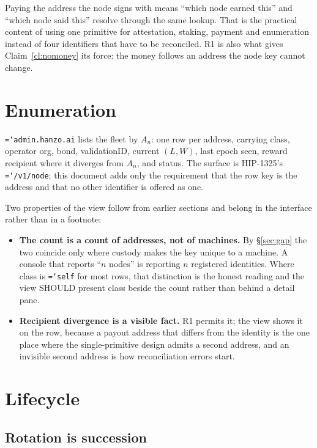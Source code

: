 \documentclass[11pt,a4paper]{article}
\newcommand{\code}[1]{\texttt{\hyphenchar\font=`\-\relax #1}}
\begin{document}
Paying the address the node signs with means ``which node earned this'' and ``which
node said this'' resolve through the same lookup. That is the practical content of
using one primitive for attestation, staking, payment and enumeration instead of
four identifiers that have to be reconciled. R1 is also what gives
Claim~\ref{cl:nomoney} its force: the money follows an address the node key cannot
change.

\section{Enumeration}
\label{sec:enum}

\code{admin.hanzo.ai} lists the fleet by $A_n$: one row per address, carrying
class, operator org, bond, validationID, current $(L, W)$, last epoch seen, reward
recipient where it diverges from $A_n$, and status. The surface is HIP-1325's
\code{/v1/node}; this document adds only the requirement that the row key is the
address and that no other identifier is offered as one.

Two properties of the view follow from earlier sections and belong in the
interface rather than in a footnote:

\begin{itemize}
\item \textbf{The count is a count of addresses, not of machines.} By
  \S\ref{sec:gap} the two coincide only where custody makes the key unique to a
  machine. A console that reports ``$n$ nodes'' is reporting $n$ registered
  identities. Where class is \code{self} for most rows, that distinction is the
  honest reading and the view SHOULD present class beside the count rather than
  behind a detail pane.
\item \textbf{Recipient divergence is a visible fact.} R1 permits it; the view
  shows it on the row, because a payout address that differs from the identity is
  the one place where the single-primitive design admits a second address, and an
  invisible second address is how reconciliation errors start.
\end{itemize}

\section{Lifecycle}
\label{sec:lifecycle}

\subsection{Rotation is succession}
\label{sec:succ}
\end{document}
